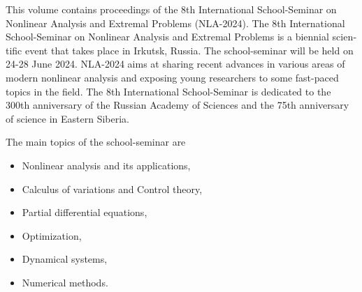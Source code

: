 \documentclass[12pt,final]{llncs}
\begin{document}
 \begin{english}

This volume contains proceedings of the 8th International School-Seminar on Nonlinear Analysis and Extremal Problems (NLA-2024).
The 8th International School-Seminar on Nonlinear Analysis and Extremal Problems is a biennial scientific event that takes place in Irkutsk, Russia. The school-seminar  will be held on 24-28 June 2024. NLA-2024 aims at sharing recent advances in various areas of modern nonlinear analysis and exposing young researchers to some fast-paced topics in the field. The 8th International School-Seminar is dedicated to the 300th anniversary of the Russian Academy of Sciences and the 75th anniversary of science in Eastern Siberia.


The main topics of the  school-seminar are
\begin{itemize}
\item Nonlinear analysis and its applications,
\item Calculus of variations and Control theory,
\item Partial differential equations,
\item Optimization,
\item Dynamical systems,
\item  Numerical methods.


\end{itemize}
\end{english}
\end{document}
